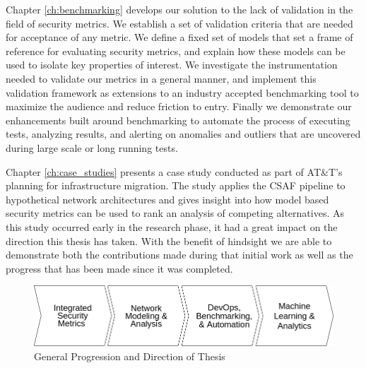 

Chapter \ref{ch:benchmarking} develops our solution to the lack of validation in the field of security metrics. We establish a set of validation criteria that are needed for acceptance of any metric. We define a fixed set of models that set a frame of reference for evaluating security metrics, and explain how these models can be used to isolate key properties of interest. We investigate the instrumentation needed to validate our metrics in a general manner, and implement this validation framework as extensions to an industry accepted benchmarking tool to maximize the audience and reduce friction to entry. Finally we demonstrate our enhancements built around benchmarking to automate the process of executing tests, analyzing results, and alerting on anomalies and outliers that are uncovered during large scale or long running tests.

Chapter \ref{ch:case_studies} presents a case study conducted as part of AT\&T's planning for infrastructure migration. The study applies the CSAF\cite{Abraham_Nair_2015a} pipeline to hypothetical network architectures and gives insight into how model based security metrics can be used to rank an analysis of competing alternatives. As this study occurred early in the research phase, it had a great impact on the direction this thesis has taken. With the benefit of hindsight we are able to demonstrate both the contributions made during that initial work as well as the progress that has been made since it was completed. 



\begin{figure}[ht]
\centering
\includegraphics[width=\textwidth]{resource/img/ch_future/timeline_broad.png}
\caption{General Progression and Direction of Thesis}
\label{fig:future:timeline_broad}
\end{figure} 

